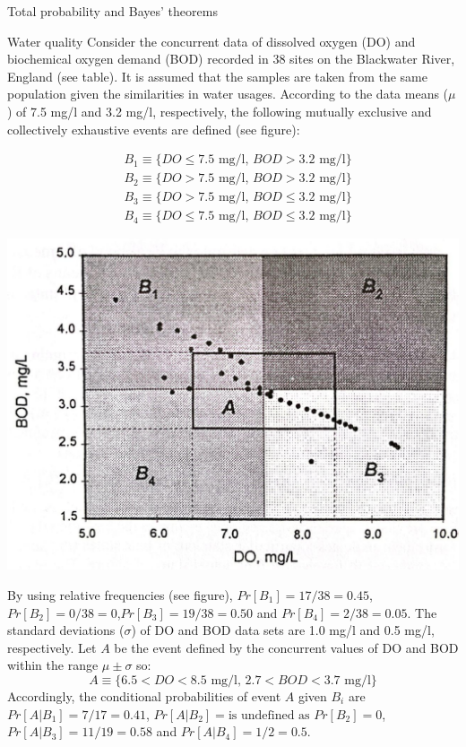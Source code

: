 \documentclass[8pt]{beamer}
\begin{document}
\begin{frame}{Total probability and Bayes' theorems}
    \begin{exampleblock}{Water quality}
        Consider the concurrent data of dissolved oxygen (DO) and biochemical oxygen demand (BOD) recorded in 38 sites on the Blackwater River, England (see table). It is assumed that the samples are taken from the same population given the similarities in water usages. According to the data means ($\mu$) of 7.5 mg/l and 3.2 mg/l, respectively, the following mutually exclusive and collectively exhaustive events are defined (see figure):
        \begin{minipage}{0.7\textwidth}
        \begin{align*}
            & B_1 \equiv \{ DO \leq 7.5 \text{ mg/l, } BOD > 3.2 \text{ mg/l} \} \\
            & B_2 \equiv \{ DO > 7.5 \text{ mg/l, } BOD > 3.2 \text{ mg/l} \} \\
            & B_3 \equiv \{ DO > 7.5 \text{ mg/l, } BOD \leq 3.2 \text{ mg/l} \} \\
            & B_4 \equiv \{ DO \leq 7.5 \text{ mg/l, } BOD \leq 3.2 \text{ mg/l} \}
        \end{align*}
        \end{minipage}
        \hfill
        \begin{minipage}{0.7\textwidth}
            \includegraphics[width=\linewidth]{fi228.jpeg}
        \end{minipage}
        By using relative frequencies (see figure), $Pr[B_1] = 17/38 = 0.45$, $Pr[B_2] = 0/38 = 0$,$Pr[B_3] = 19/38 = 0.50$ and $Pr[B_4] = 2/38 = 0.05$. The standard deviations ($\sigma$) of DO and BOD data sets are 1.0 mg/l and 0.5 mg/l, respectively. Let $A$ be the event defined by the concurrent values of DO and BOD within the range $\mu \pm \sigma$ so:
        $$
        A \equiv \{ 6.5 < DO < 8.5 \text{ mg/l, } 2.7 < BOD < 3.7 \text{ mg/l} \}
        $$
Accordingly, the conditional probabilities of event $A$ given $B_i$ are $Pr[A | B_1] = 7/17 = 0.41$, $Pr[A | B_2] = \text{is undefined as } Pr[B_2] = 0$, $Pr[A | B_3] = 11/19 = 0.58$ and $Pr[A | B_4] = 1/2 = 0.5$. 
    \end{exampleblock}
\end{frame}
\end{document}
